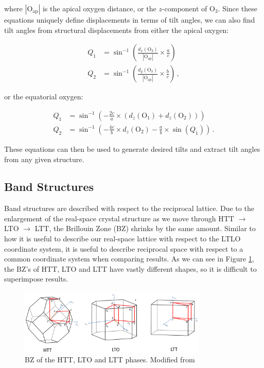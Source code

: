\noindent where $| \text{O}_\text{ap} |$ is the apical oxygen distance, or the $z$-component of O$_3$. Since these equations uniquely define displacements in terms of tilt angles, we can also find tilt angles from structural displacements from either the apical oxygen:

\begin{align*}
Q_1 &= \sin^{-1} \left( \frac{d_x(\text{O}_3)}{| \text{O}_\text{ap} |} \times \frac{a}{c} \right) \\
Q_2 &= \sin^{-1} \left( \frac{d_y(\text{O}_3)}{| \text{O}_\text{ap} |} \times \frac{b}{c} \right) \, ,
\end{align*}

\noindent or the equatorial oxygen:

\begin{align*}
Q_1 &= \sin^{-1}  \left( - \frac{2c}{a} \times (d_z(\text{O}_1) + d_z(\text{O}_2)) \right) \\
Q_2 &= \sin^{-1}  \left( -\frac{4c}{b} \times d_z(\text{O}_2) - \frac{a}{b} \times \sin (Q_1) \right) \, .
\end{align*}

\noindent These equations can then be used to generate desired tilts and extract tilt angles from any given structure.

\subsection{Band Structures}
Band structures are described with respect to the reciprocal lattice. Due to the enlargement of the real-space crystal structure as we move through HTT $\rightarrow$ LTO $\rightarrow$ LTT, the Brillouin Zone (BZ) shrinks by the same amount. Similar to how it is useful to describe our real-space lattice with respect to the LTLO coordinate system, it is useful to describe reciprocal space with respect to a common coordinate system when comparing results. As we can see in Figure \ref{fig:allbz}, the BZ's of HTT, LTO and LTT have vastly different shapes, so it is difficult to superimpose results.

\begin{figure}
	\centering
	\includegraphics[width=0.8\textwidth]{fig/simulation/BZAll.png}
	\caption[HTT LTO LTT BZs]{BZ of the HTT, LTO and LTT phases. Modified from }
	\label{fig:allbz}
\end{figure}


